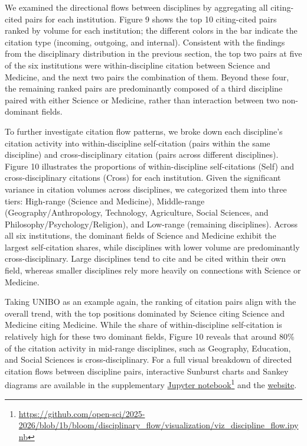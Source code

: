 \documentclass[year=2026]{cup-journal}
\begin{document}
We examined the directional flows between disciplines by aggregating all citing-cited pairs for each institution. Figure 9 shows the top 10 citing-cited pairs ranked by volume for each institution; the different colors in the bar indicate the citation type (incoming, outgoing, and internal). Consistent with the findings from the disciplinary distribution in the previous section, the top two pairs at five of the six institutions were within-discipline citation between Science and Medicine, and the next two pairs the combination of them. Beyond these four, the remaining ranked pairs are predominantly composed of a third discipline paired with either Science or Medicine, rather than interaction between two non-dominant fields. 

To further investigate citation flow patterns, we broke down each discipline’s citation activity into within-discipline self-citation (pairs within the same discipline) and cross-disciplinary citation (pairs across different disciplines). Figure 10 illustrates the proportions of within-discipline self-citations (Self) and cross-disciplinary citations (Cross) for each institution. Given the significant variance in citation volumes across disciplines, we categorized them into three tiers: High-range (Science and Medicine), Middle-range (Geography/Anthropology, Technology, Agriculture, Social Sciences, and Philosophy/Psychology/Religion), and Low-range (remaining disciplines). Across all six institutions, the dominant fields of Science and Medicine exhibit the largest self-citation shares, while disciplines with lower volume are predominantly cross-disciplinary. Large disciplines tend to cite and be cited within their own field, whereas smaller disciplines rely more heavily on connections with Science or Medicine.

Taking UNIBO as an example again, the ranking of citation pairs align with the overall trend, with the top positions dominated by Science citing Science and Medicine citing Medicine. While the share of within-discipline self-citation is relatively high for these two dominant fields, Figure 10 reveals that around 80\% of the citation activity in mid-range disciplines, such as Geography, Education, and Social Sciences is cross-disciplinary. For a full visual breakdown of directed citation flows between discipline pairs, interactive Sunburst charts and Sankey diagrams are available in the supplementary \href{https://github.com/open-sci/2025-2026/blob/1b/bloom/disciplinary_flow/visualization/viz_discipline_flow.ipynb}{Jupyter notebook}\footnote{\url{https://github.com/open-sci/2025-2026/blob/1b/bloom/disciplinary_flow/visualization/viz_discipline_flow.ipynb}} and the \href{https://open-sci.github.io/2025-2026/}{website}.
\end{document}

